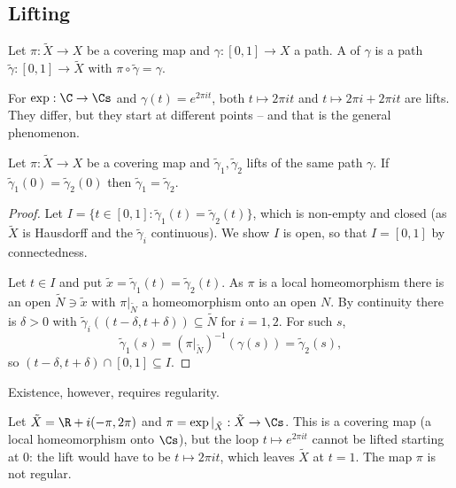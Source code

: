 \subsection{Lifting}

\begin{definition}[Lift]
	Let $\pi : \tilde X \to X$ be a covering map and $\gamma : [0,1] \to X$ a path. A
	 of $\gamma$ is a path $\tilde \gamma : [0,1] \to \tilde X$ with
	$\pi \circ \tilde\gamma = \gamma$.
\end{definition}

\begin{example}
	For $\exp : \C \to \Cs$ and $\gamma(t) = e^{2\pi i t}$, both $t \mapsto 2\pi i t$ and
	$t \mapsto 2\pi i + 2\pi i t$ are lifts. They differ, but they start at different
	points -- and that is the general phenomenon.
\end{example}

\begin{proposition}\label{prop:liftunique}
	Let $\pi : \tilde X \to X$ be a covering map and $\tilde\gamma_1, \tilde\gamma_2$ lifts
	of the same path $\gamma$. If $\tilde\gamma_1(0) = \tilde\gamma_2(0)$ then
	$\tilde\gamma_1 = \tilde\gamma_2$.
\end{proposition}

\begin{proof}
	Let $I = \{t \in [0,1] : \tilde\gamma_1(t) = \tilde\gamma_2(t)\}$, which is non-empty
	and closed (as $\tilde X$ is Hausdorff and the $\tilde \gamma_i$ continuous). We show
	$I$ is open, so that $I = [0,1]$ by connectedness.

	Let $t \in I$ and put $\tilde x = \tilde \gamma_1(t) = \tilde\gamma_2(t)$. As $\pi$ is
	a local homeomorphism there is an open $\tilde N \ni \tilde x$ with $\pi|_{\tilde N}$ a
	homeomorphism onto an open $N$. By continuity there is $\delta > 0$ with
	$\tilde\gamma_i((t-\delta, t+\delta)) \subseteq \tilde N$ for $i = 1,2$. For such $s$,
	$$
	\tilde\gamma_1(s) = (\pi|_{\tilde N})^{-1}(\gamma(s)) = \tilde\gamma_2(s),
	$$
	so $(t - \delta, t+\delta) \cap [0,1] \subseteq I$.
\end{proof}

Existence, however, requires regularity.

\begin{example}
	Let $\tilde X = \R + i(-\pi, 2\pi)$ and $\pi = \exp|_{\tilde X} : \tilde X \to \Cs$.
	This is a covering map (a local homeomorphism onto $\Cs$), but the loop
	$t \mapsto e^{2\pi i t}$ cannot be lifted starting at $0$: the lift would have to be
	$t \mapsto 2\pi i t$, which leaves $\tilde X$ at $t=1$. The map $\pi$ is not regular.
\end{example}

